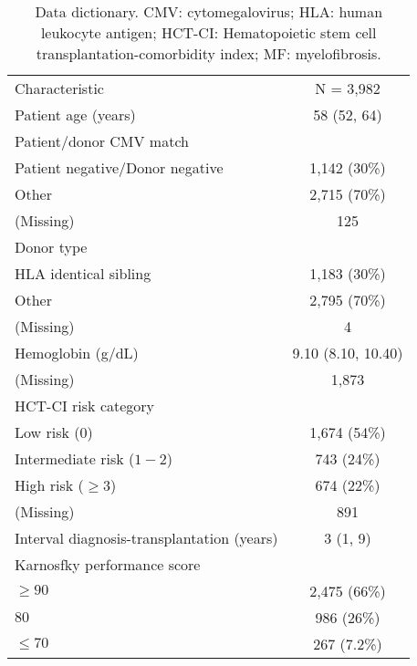\documentclass[
  12pt,
  a4paper,
]{article}
\begin{document}
\begin{longtable}[t]{lc}

\caption{\label{tbl-data-dict}Data dictionary. CMV: cytomegalovirus;
HLA: human leukocyte antigen; HCT-CI: Hematopoietic stem cell
transplantation-comorbidity index; MF: myelofibrosis.}

\tabularnewline

\\
\toprule
Characteristic & N = 3,982\\
\midrule
Patient age (years) & 58 (52, 64)\\
Patient/donor CMV match & \\
\hspace{1em}Patient negative/Donor negative & 1,142 (30\%)\\
\hspace{1em}Other & 2,715 (70\%)\\
\hspace{1em}(Missing) & 125\\
Donor type & \\
\hspace{1em}HLA identical sibling & 1,183 (30\%)\\
\hspace{1em}Other & 2,795 (70\%)\\
\hspace{1em}(Missing) & 4\\
Hemoglobin (g/dL) & 9.10 (8.10, 10.40)\\
\hspace{1em}(Missing) & 1,873\\
HCT-CI risk category & \\
\hspace{1em}Low risk ($0$) & 1,674 (54\%)\\
\hspace{1em}Intermediate risk ($1-2$) & 743 (24\%)\\
\hspace{1em}High risk ($\geq 3$) & 674 (22\%)\\
\hspace{1em}(Missing) & 891\\
Interval diagnosis-transplantation (years) & 3 (1, 9)\\
Karnosfky performance score & \\
\hspace{1em}$\geq 90$ & 2,475 (66\%)\\
\hspace{1em}$80$ & 986 (26\%)\\
\hspace{1em}$\leq 70$ & 267 (7.2\%)\\

\end{longtable}
\end{document}
